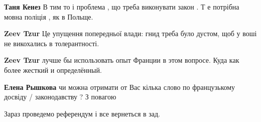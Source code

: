 \begin{itemize}
\begin{itemize}
 
\textbf{Таня Кенез} В тим то і проблема , що треба виконувати закон . Т е потрібна мовна поліція , як в Польще.

 
\textbf{Zeev Tzur} Це упущення попередньої влади: гнид треба було дустом, щоб у воші не викохались в толерантності.

 
\textbf{Zeev Tzur} лучше бы использовать опыт Франции в этом вопросе. Куда как более жесткий и определённый.

 
\textbf{Елена Рышкова} чи можна отримати от Вас кілька слово по французькому досвіду / законодавству ? З повагою
\end{itemize}

 
Зараз проведемо референдум і все вернеться в зад.

\begin{itemize}
 

\end{itemize}
\end{itemize}
